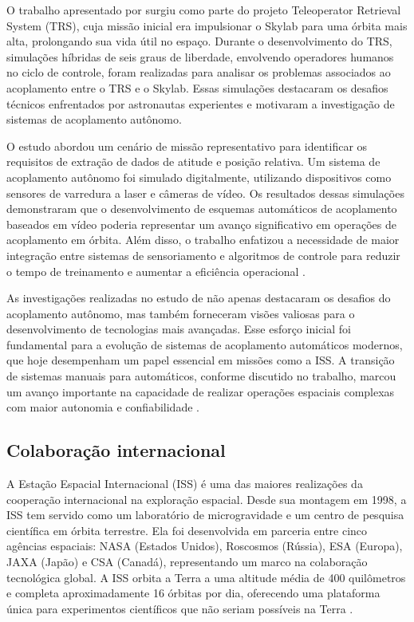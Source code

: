 O trabalho apresentado por \citep{micheal1981} surgiu como parte do projeto Teleoperator Retrieval System (TRS), cuja missão inicial era impulsionar o Skylab para uma órbita mais alta, prolongando sua vida útil no espaço. Durante o desenvolvimento do TRS, simulações híbridas de seis graus de liberdade, envolvendo operadores humanos no ciclo de controle, foram realizadas para analisar os problemas associados ao acoplamento entre o TRS e o Skylab. Essas simulações destacaram os desafios técnicos enfrentados por astronautas experientes e motivaram a investigação de sistemas de acoplamento autônomo.

O estudo abordou um cenário de missão representativo para identificar os requisitos de extração de dados de atitude e posição relativa. Um sistema de acoplamento autônomo foi simulado digitalmente, utilizando dispositivos como sensores de varredura a laser e câmeras de vídeo. Os resultados dessas simulações demonstraram que o desenvolvimento de esquemas automáticos de acoplamento baseados em vídeo poderia representar um avanço significativo em operações de acoplamento em órbita. Além disso, o trabalho enfatizou a necessidade de maior integração entre sistemas de sensoriamento e algoritmos de controle para reduzir o tempo de treinamento e aumentar a eficiência operacional \citep{micheal1981}.

As investigações realizadas no estudo de \citep{micheal1981} não apenas destacaram os desafios do acoplamento autônomo, mas também forneceram visões valiosas para o desenvolvimento de tecnologias mais avançadas. Esse esforço inicial foi fundamental para a evolução de sistemas de acoplamento automáticos modernos, que hoje desempenham um papel essencial em missões como a ISS. A transição de sistemas manuais para automáticos, conforme discutido no trabalho, marcou um avanço importante na capacidade de realizar operações espaciais complexas com maior autonomia e confiabilidade \citep{micheal1981}.

\subsection{Colaboração internacional}

A Estação Espacial Internacional (ISS) é uma das maiores realizações da cooperação internacional na exploração espacial. Desde sua montagem em 1998, a ISS tem servido como um laboratório de microgravidade e um centro de pesquisa científica em órbita terrestre. Ela foi desenvolvida em parceria entre cinco agências espaciais: NASA (Estados Unidos), Roscosmos (Rússia), ESA (Europa), JAXA (Japão) e CSA (Canadá), representando um marco na colaboração tecnológica global. A ISS orbita a Terra a uma altitude média de 400 quilômetros e completa aproximadamente 16 órbitas por dia, oferecendo uma plataforma única para experimentos científicos que não seriam possíveis na Terra \citep{nasaISS}.

